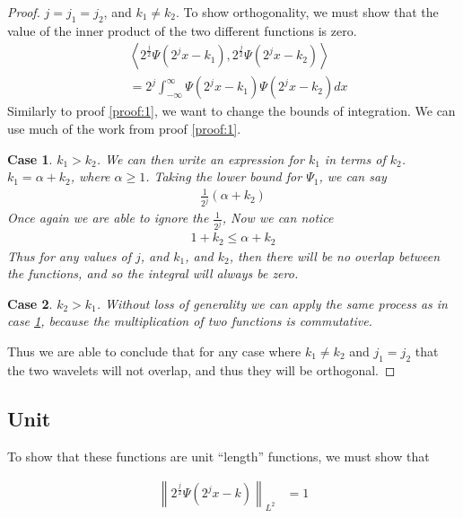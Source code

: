 \documentclass[12pt]{amsart}
\newcommand{\norm}[1]{\left\lVert#1\right\rVert}
\newtheorem{case}{Case}
\begin{document}
\begin{proof}\label{proof:2}
  $j=j_1=j_2$, and $k_1 \neq k_2$. To show orthogonality, we must show that the
  value of the inner product of the two different functions is zero.
  \begin{align}
    &\left<2^{\frac{j}{2}}\Psi\left(2^jx-k_1\right),
    2^{\frac{j}{2}}\Psi\left(2^jx-k_2\right)\right>\\
    &=2^j\int_{-\infty}^{\infty}\Psi\left(2^jx-k_1\right)\Psi\left(2^jx-k_2\right)dx
  \end{align}
  Similarly to proof \ref{proof:1}, we want to change the bounds of
  integration. We can use much of the work from proof \ref{proof:1}.
  \begin{case}\label{case:2.1}
    $k_1>k_2$. We can then write an expression for $k_1$ in terms of $k_2$.
    $k_1 = \alpha + k_2$, where $\alpha \geq 1$. Taking the lower bound for
    $\Psi_1$, we can say
    \begin{align}
      \frac{1}{2^j}(\alpha+k_2)
    \end{align}
    Once again we are able to ignore the $\frac{1}{2^j}$, Now we can notice
    \begin{align}
      1+k_2 \leq \alpha + k_2
    \end{align}
    Thus for any values of $j$, and $k_1$, and $k_2$, then there will be no
    overlap between the functions, and so the integral will always be zero.
  \end{case}
  \begin{case}\label{case:2.2}
    $k_2>k_1$. Without loss of generality we can apply the same process as in
    case \ref{case:2.1}, because the multiplication of two functions is
    commutative.
  \end{case}
  Thus we are able to conclude that for any case where $k_1 \neq k_2$ and $j_1
  =j_2$ that the two wavelets will not overlap, and thus they will be
  orthogonal.
\end{proof}

\subsection{Unit}%
\label{sub:unit}

To show that these functions are unit ``length'' functions, we must show that

\begin{align}
  \norm{2^\frac{j}{2}\Psi\left(2^jx-k\right)}_{L^2} &= 1
\end{align}
\end{document}
